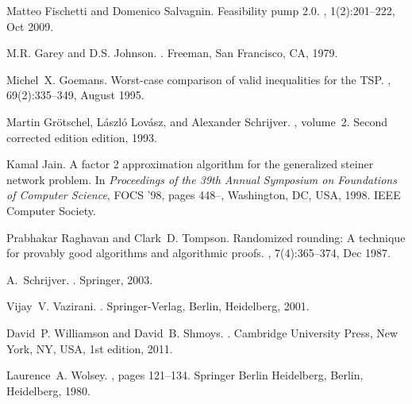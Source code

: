 \documentclass[runningheads]{llncs}
\begin{document}
\begin{thebibliography}{10}
	Matteo Fischetti and Domenico Salvagnin.
	\newblock Feasibility pump 2.0.
	, 1(2):201--222, Oct 2009.
	
	M.R. Garey and D.S. Johnson.
	.
	\newblock Freeman, San Francisco, CA, 1979.
	
	Michel~X. Goemans.
	\newblock Worst-case comparison of valid inequalities for the {TSP}.
	, 69(2):335--349, August 1995.
	
	Martin Gr{\"o}tschel, L{\'a}szl{\'o} Lov{\'a}sz, and Alexander Schrijver.
	, volume~2.
	\newblock Second corrected edition edition, 1993.
	
	Kamal Jain.
	\newblock A factor 2 approximation algorithm for the generalized steiner
	network problem.
	\newblock In {\em Proceedings of the 39th Annual Symposium on Foundations of
		Computer Science}, FOCS '98, pages 448--, Washington, DC, USA, 1998. IEEE
	Computer Society.
	
	Prabhakar Raghavan and Clark~D. Tompson.
	\newblock Randomized rounding: A technique for provably good algorithms and
	algorithmic proofs.
	, 7(4):365--374, Dec 1987.
	
	A.~Schrijver.
	.
	\newblock Springer, 2003.
	
	Vijay~V. Vazirani.
	.
	\newblock Springer-Verlag, Berlin, Heidelberg, 2001.
	
	David~P. Williamson and David~B. Shmoys.
	.
	\newblock Cambridge University Press, New York, NY, USA, 1st edition, 2011.
	
	Laurence~A. Wolsey.
	,
	pages 121--134.
	\newblock Springer Berlin Heidelberg, Berlin, Heidelberg, 1980.
\clearpage
	
\end{thebibliography}
\appendix


\end{document}
